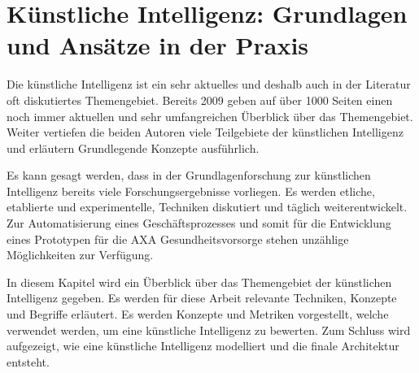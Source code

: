 
\section{Künstliche Intelligenz: Grundlagen und Ansätze in der Praxis}
\label{chap:ai}



Die künstliche Intelligenz ist ein sehr aktuelles und deshalb auch in der Literatur oft diskutiertes Themengebiet. Bereits 2009 geben \textcite{Russell2009} auf über 1000 Seiten einen noch immer aktuellen und sehr umfangreichen Überblick über das Themengebiet. Weiter vertiefen die beiden Autoren viele Teilgebiete der künstlichen Intelligenz und erläutern Grundlegende Konzepte ausführlich.


Es kann gesagt werden, dass in der Grundlagenforschung zur künstlichen Intelligenz bereits viele Forschungsergebnisse vorliegen. Es werden etliche, etablierte und experimentelle, Techniken diskutiert und täglich weiterentwickelt. Zur Automatisierung eines Geschäftsprozesses und somit für die Entwicklung eines Prototypen für die AXA Gesundheitsvorsorge stehen unzählige Möglichkeiten zur Verfügung.

In diesem Kapitel wird ein Überblick über das Themengebiet der künstlichen Intelligenz gegeben. Es werden für diese Arbeit relevante Techniken, Konzepte und Begriffe erläutert. Es werden Konzepte und Metriken vorgestellt, welche verwendet werden, um eine künstliche Intelligenz zu bewerten. Zum Schluss wird aufgezeigt, wie eine künstliche Intelligenz modelliert und die finale Architektur entsteht.


